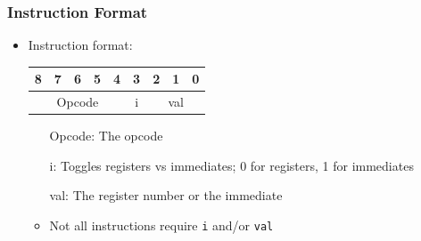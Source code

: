 	\begin{frame}
		\frametitle{Instruction Format}

		\begin{itemize}
			\item Instruction format:

				\begin{table}
					\begin{tabular}{|c|c|c|c|c|c|c|c|c|}
						\hline
						8 & 7 & 6 & 5 & 4 & 3 & 2 & 1 & 0 \\ \hline
						\multicolumn{5}{|c|}{Opcode} & i & \multicolumn{3}{|c|}{val} \\ \hline
					\end{tabular}
				\end{table}

				\begin{itemize}
					\item[Opcode:] The opcode
					\item[i:] Toggles registers vs immediates; 0 for registers, 1 for immediates
					\item[val:] The register number or the immediate
				\end{itemize}

				\begin{itemize}
					\item Not all instructions require \texttt{i} and/or \texttt{val}
				\end{itemize}
		\end{itemize}
	\end{frame}

